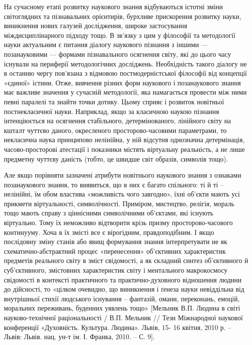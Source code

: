 На сучасному етапі розвитку наукового знання відбуваються істотні зміни
світоглядних та пізнавальних орієнтирів, бурхливе прискорення розвитку
науки, виникнення нових галузей дослідження, широке застосування
міждисциплінарного підходу тощо. В зв’язку з цим у філософії та методології
науки актуальним є питання діалогу наукового пізнання з іншими ---
позанауковими --- формами пізнавального осягнення світу, які до цього часу
існували на периферії методологічних досліджень. Необхідність такого діалогу
не в останню чергу пов’язана з відмовою постмодерністської філософії від
концепції «єдиної» істини. Отже, вивчення різних форм наукового і
позанаукового знання має важливе значення у сучасній методології, яка
намагається провести між ними певні паралелі та знайти точки дотику. Цьому
сприяє і розвиток новітньої постнекласичної науки. Наприклад, якщо за
класичною наукою пізнання інтенціюється на осягнення стабільного,
детермінованого, лінійного світу на кшталт чуттєво даного, окресленого
просторово-часовими параметрами, то некласична наука принципово нелінійна,
у ній відсутня однозначна детермінація, часово-просторові атестації і
показники містять віртуальну реальність, а не лише предметну чуттєву даність
(тобто, це швидше світ образів, символів тощо).

Але якщо порівняти зазначені атрибути новітнього наукового знання з
ознаками позанаукового знання, то виявиться, що в них є багато спільного: ті й
ті – нелінійні, їм обом властива «можливість чого завгодно», їхні об’єкти мають
усі прикмети віртуальності, символічності. Приміром, мистецтво, релігія,
мораль тощо мають справу з ціннісними символічними об’єктами, які існують
віртуально. Тому їх неможливо відтворити крізь призму просторово-часового
континууму. Хоча в їх змісті все є вірогідним, правдоподібним. І якщо
послідовну зміну станів або явищ формування знання інтерпретувати не як
схематично-абстрактний процес «перенесення» об’єктивних характеристик
предметів реального світу в зміст свідомості, а як складний синтез об’єктивного
й суб’єктивного, змістовних характеристик світу і ментального макрокосмосу
свідомості в контексті практичного та практично-духовного відношення
людини до дійсності, то «цілком очевидно, що виникнення і ґенеза науки
невіддільна від внутрішньої стихії людського існування – фантазій, омани,
переконань, емоцій, моральних переживань, буденних уявлень тощо» [Мельник
В.П. Людина в світі науково-технічної раціональності / В.П. Мельник // Тези
Міжнародної наукової конференції «Духовність. Культура. Людина». Львів, 15-
16 квітня, 2010 р. – Львів: Львів. нац. ун-т ім. І. Франка, 2010. – С. 9].

